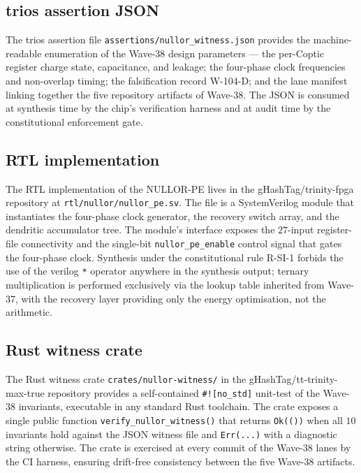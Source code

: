 \subsection{trios assertion JSON}
\label{subsec:trios_json}

The trios assertion file \texttt{assertions/nullor\_witness.json} provides the
machine-readable enumeration of the Wave-38 design parameters --- the per-Coptic
register charge state, capacitance, and leakage; the four-phase clock frequencies
and non-overlap timing; the falsification record W-104-D; and the lane manifest
linking together the five repository artifacts of Wave-38.  The JSON is consumed
at synthesis time by the chip's verification harness and at audit time by the
constitutional enforcement gate.

\subsection{RTL implementation}
\label{subsec:rtl}

The RTL implementation of the NULLOR-PE lives in the gHashTag/trinity-fpga
repository at \texttt{rtl/nullor/nullor\_pe.sv}.  The file is a SystemVerilog
module that instantiates the four-phase clock generator, the recovery switch
array, and the dendritic accumulator tree.  The module's interface exposes the
$27$-input register-file connectivity and the single-bit \texttt{nullor\_pe\_enable}
control signal that gates the four-phase clock.  Synthesis under the constitutional
rule R-SI-1 forbids the use of the verilog \texttt{*} operator anywhere in the
synthesis output; ternary multiplication is performed exclusively via the lookup
table inherited from Wave-37, with the recovery layer providing only the energy
optimisation, not the arithmetic.

\subsection{Rust witness crate}
\label{subsec:rust_crate}

The Rust witness crate \texttt{crates/nullor-witness/} in the
gHashTag/tt-trinity-max-true repository provides a self-contained
\texttt{\#![no\_std]} unit-test of the Wave-38 invariants, executable in any
standard Rust toolchain.  The crate exposes a single public function
\texttt{verify\_nullor\_witness()} that returns \texttt{Ok(())} when all $10$
invariants hold against the JSON witness file and \texttt{Err(...)} with a
diagnostic string otherwise.  The crate is exercised at every commit of the
Wave-38 lanes by the CI harness, ensuring drift-free consistency between the
five Wave-38 artifacts.

